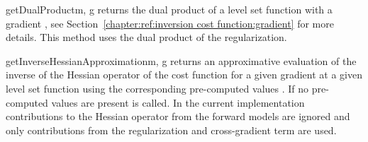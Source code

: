 \begin{methoddesc}[InversionCostFunction]{getDualProduct}{m, g}
returns the dual product of a level set function  with a gradient
, see Section~\ref{chapter:ref:inversion cost function:gradient} for more details.
This method uses the dual product of the regularization.
\end{methoddesc}

\begin{methoddesc}[InversionCostFunction]{getInverseHessianApproximation}{m, g }
returns an approximative evaluation of the inverse of the Hessian operator of
the cost function for a given gradient  at a given level set function
 using the corresponding pre-computed values .
If no pre-computed values are present  is called.
In the current implementation contributions to the Hessian operator from the
forward models are ignored and only contributions from the regularization and
cross-gradient term are used.
\end{methoddesc}


